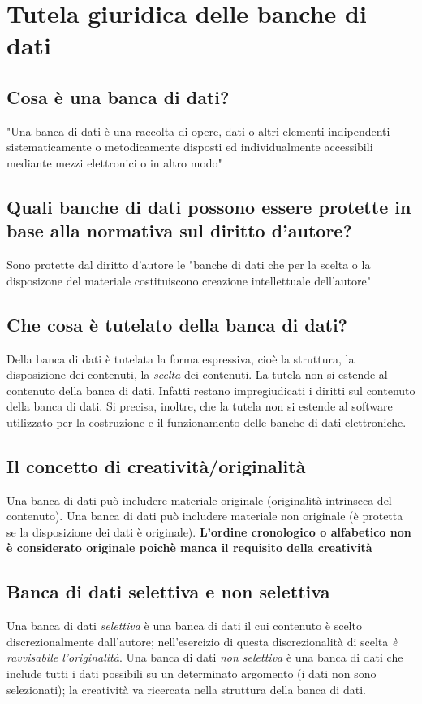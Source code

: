 \newpage
\section{Tutela giuridica delle banche di dati}

\subsection{Cosa è una banca di dati?}
"Una banca di dati è una raccolta di opere, dati o altri elementi indipendenti sistematicamente
o metodicamente disposti ed individualmente accessibili mediante mezzi elettronici o in altro
modo"

\subsection{Quali banche di dati possono essere protette in base alla normativa sul diritto d'autore?}
Sono protette dal diritto d'autore le "banche di dati che per la scelta o la disposizone
del materiale costituiscono creazione intellettuale dell'autore"

\subsection{Che cosa è tutelato della banca di dati?}
Della banca di dati è tutelata la forma espressiva, cioè la struttura, la disposizione dei contenuti,
la \emph{scelta} dei contenuti.\newline
La tutela non si estende al contenuto della banca di dati. Infatti restano impregiudicati i diritti sul contenuto
della banca di dati.\newline
Si precisa, inoltre, che la tutela non si estende al software utilizzato per la costruzione e il
funzionamento delle banche di dati elettroniche.

\subsection{Il concetto di creatività/originalità}
Una banca di dati può includere materiale originale (originalità intrinseca del contenuto).\newline
Una banca di dati può includere materiale non originale (è protetta se la disposizione dei dati
è originale).\newline
\textbf{L'ordine cronologico o alfabetico non è considerato originale poichè manca il requisito
della creatività}

\subsection{Banca di dati selettiva e non selettiva}
Una banca di dati \emph{selettiva} è una banca di dati il cui contenuto è scelto discrezionalmente
dall'autore; nell'esercizio di questa discrezionalità di scelta \emph{è ravvisabile l'originalità}.\newline
Una banca di dati \emph{non selettiva} è una banca di dati che include tutti i dati possibili su un determinato
argomento (i dati non sono selezionati); la creatività va ricercata nella struttura della banca di dati.

